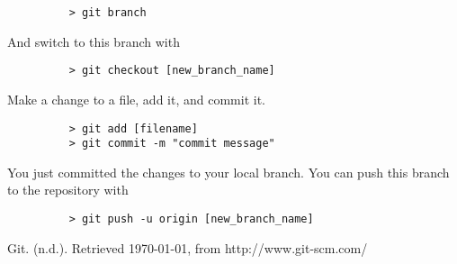 \documentclass[11pt]{report}
\begin{document}
\begin{figure}[H]
  \begin{lstlisting}
    > git branch
  \end{lstlisting}
\end{figure}

And switch to this branch with

\begin{figure}[H]
  \begin{lstlisting}
    > git checkout [new_branch_name]
  \end{lstlisting}
\end{figure}

Make a change to a file, add it, and commit it.

\begin{figure}[H]
  \begin{lstlisting}
    > git add [filename]
    > git commit -m "commit message"
    \end{lstlisting}
\end{figure}

You just committed the changes to your local branch.  You can push
this branch to the repository with

\begin{figure}[H]
  \begin{lstlisting}
    > git push -u origin [new_branch_name]
  \end{lstlisting}
\end{figure}

\begin{thebibliography}{9}

    Git. (n.d.). Retrieved \today, from http://www.git-scm.com/

\end{thebibliography}
\end{document}
